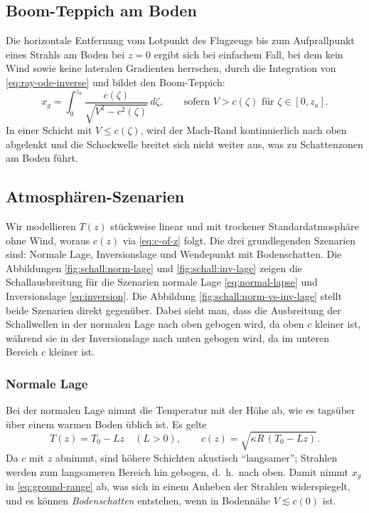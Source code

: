 \subsection{Boom-Teppich am Boden}
Die horizontale Entfernung vom Lotpunkt des Flugzeugs bis zum
Aufprallpunkt eines Strahls am Boden bei $z=0$ ergibt sich bei einfachem
Fall, bei dem kein Wind sowie keine lateralen Gradienten herrschen, durch die
Integration von \eqref{eq:ray-ode-inverse} und bildet den Boom-Teppich:
\begin{equation}
    \quad
    x_g = \int_{0}^{z_a} \frac{c(\zeta)}{\sqrt{V^2 - c^2(\zeta)}} \,d\zeta,
    \qquad \text{sofern } V>c(\zeta) \text{ für } \zeta\in[0,z_a].
    \quad
    \label{eq:ground-range}
\end{equation}
In einer Schicht mit $V\le c(\zeta)$, wird der Mach-Rand kontinuierlich
nach oben abgelenkt und die Schockwelle breitet sich nicht weiter aus,
was zu Schattenzonen am Boden führt.

\subsection{Atmosphären-Szenarien}\label{schall:subsection:atmos-scenarios}
Wir modellieren $T(z)$ stückweise linear und mit trockener
Standardatmosphäre ohne Wind, woraus $c(z)$ via \eqref{eq:c-of-z} folgt.
Die drei grundlegenden Szenarien sind: Normale Lage, Inversionslage und
Wendepunkt mit Bodenschatten.
Die Abbildungen \ref{fig:schall:norm-lage} und \ref{fig:schall:inv-lage}
zeigen die Schallausbreitung für die Szenarien normale Lage
\eqref{eq:normal-lapse} und Inversionslage \eqref{eq:inversion}.
Die Abbildung \ref{fig:schall:norm-vs-inv-lage} stellt beide Szenarien
direkt gegenüber.
Dabei sieht man, dass die Ausbreitung der Schallwellen
in der normalen Lage nach oben gebogen wird, da oben $c$ kleiner ist,
während sie in der Inversionslage nach unten gebogen wird,
da im unteren Bereich $c$ kleiner ist.

\subsubsection{Normale Lage}
Bei der normalen Lage nimmt die Temperatur mit der Höhe ab,
wie es tagsüber über einem warmen Boden üblich ist.
Es gelte
\begin{equation}
    T(z) = T_0 - Lz \quad (L>0),
    \qquad
    c(z) = \sqrt{\kappa R\,(T_0 - Lz)} .
    \label{eq:normal-lapse}
\end{equation}
Da $c$ mit $z$ abnimmt, sind höhere Schichten akustisch
``langsamer''; Strahlen werden zum langsameren Bereich hin
gebogen, d.~h.~nach oben.
Damit nimmt $x_g$ in \eqref{eq:ground-range} ab, was sich in einem Anheben
der Strahlen widerspiegelt, und es können \emph{Bodenschatten}
entstehen, wenn in Bodennähe $V\lesssim c(0)$ ist.

